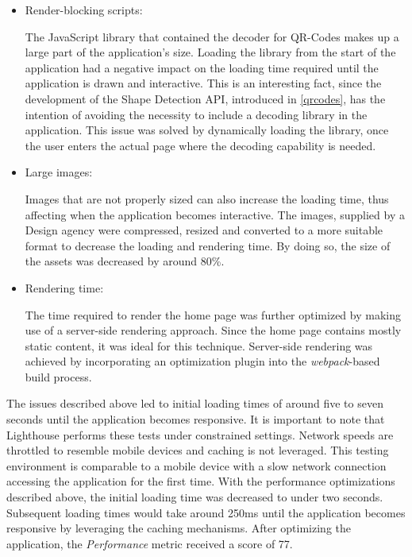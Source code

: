 \begin{itemize}
\item Render-blocking scripts:

The JavaScript library that contained the decoder for QR-Codes makes up a large part of the application's size. Loading the library from the start of the application had a negative impact on the loading time required until the application is drawn and interactive. This is an interesting fact, since the development of the Shape Detection API, introduced in \ref{qrcodes}, has the intention of avoiding the necessity to include a decoding library in the application. This issue was solved by dynamically loading the library, once the user enters the actual page where the decoding capability is needed.
\item Large images:

Images that are not properly sized can also increase the loading time, thus affecting when the application becomes interactive. The images, supplied by a Design agency were compressed, resized and converted to a more suitable format to decrease the loading and rendering time. By doing so, the size of the assets was decreased by around 80\%.

\item Rendering time:

The time required to render the home page was further optimized by making use of a server-side rendering approach. Since the home page contains mostly static content, it was ideal for this technique. Server-side rendering was achieved by incorporating an optimization plugin into the \textit{webpack}-based build process.
\end{itemize}
The issues described above led to initial loading times of around five to seven seconds until the application becomes responsive. It is important to note that Lighthouse performs these tests under constrained settings. Network speeds are throttled to resemble mobile devices and caching is not leveraged. This testing environment is comparable to a mobile device with a slow network connection accessing the application for the first time. With the performance optimizations described above, the initial loading time was decreased to under two seconds. Subsequent loading times would take around 250ms until the application becomes responsive by leveraging the caching mechanisms.
After optimizing the application, the \textit{Performance} metric received a score of 77.


